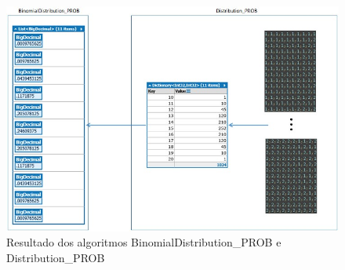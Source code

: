 \begin{apendicesenv}
\begin{figure}[H]
\caption{Resultado dos algoritmos  BinomialDistribution\_PROB e Distribution\_PROB}
\label{fig:BinomialDistribution_PROB_and_Distribution_PROB}
\centering
\includegraphics[scale=.77]{sections/images/BinomialDistribution_PROB_and_Distribution_PROB.jpg}
\end{figure}


\end{apendicesenv}
